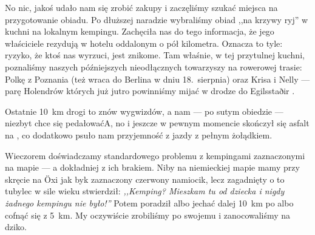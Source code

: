 

No nic, jakoś udało nam się zrobić zakupy i zaczęliśmy szukać miejsca na przygotowanie obiadu. Po dłuższej naradzie wybraliśmy obiad ,,na krzywy ryj'' w kuchni na lokalnym kempingu. Zachęciła nas do tego informacja, że jego właściciele rezydują w hotelu oddalonym o pół kilometra. Oznacza to tyle: ryzyko, że ktoś nas wyrzuci, jest znikome. Tam właśnie, w tej przytulnej kuchni, poznaliśmy naszych późniejszych nieodłącznych towarzyszy na rowerowej trasie: Polkę z Poznania (też wraca do Berlina w dniu \mbox{18. sierpnia}) oraz Krisa i Nelly --- parę Holendrów których już jutro powinniśmy mijać w drodze do Egilsstaðir .

Ostatnie 10~km drogi to znów wygwizdów, a nam --- po sutym obiedzie --- niezbyt chce się pedałować\textellipsis A, no i jeszcze w pewnym momencie skończył się asfalt na , co dodatkowo psuło nam przyjemność z jazdy z pełnym żołądkiem.


Wieczorem doświadczamy standardowego problemu z kempingami zaznaczonymi na mapie --- a dokładniej z ich brakiem. Niby na niemieckiej mapie mamy przy skręcie na Öxi jak byk zaznaczony czerwony namiocik, lecz zagadnięty o to tubylec w sile wieku stwierdził: \emph{,,Kemping? Mieszkam tu od dziecka i nigdy żadnego kempingu nie było!''} Potem poradził albo jechać dalej 10~km po  albo cofnąć się z 5~km. My oczywiście zrobiliśmy po swojemu i zanocowaliśmy na dziko.